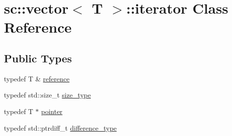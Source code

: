 \hypertarget{classsc_1_1vector_1_1iterator}{}\section{sc\+:\+:vector$<$ T $>$\+:\+:iterator Class Reference}
\label{classsc_1_1vector_1_1iterator}
\subsection*{Public Types}
\begin{DoxyCompactItemize}
\item 
typedef T \& \hyperlink{classsc_1_1vector_1_1iterator_a266d58fdf67f2129ef3dc99efd652e15}{reference}
\item 
typedef std\+::size\+\_\+t \hyperlink{classsc_1_1vector_1_1iterator_adbbf48cc59c1a22f89c9fa6a2eb0c765}{size\+\_\+type}
\item 
typedef T $\ast$ \hyperlink{classsc_1_1vector_1_1iterator_a518f02aadbb3fd937bdbda24120d2678}{pointer}
\item 
typedef std\+::ptrdiff\+\_\+t \hyperlink{classsc_1_1vector_1_1iterator_a7089358e9f654206713ecd3951ac3545}{difference\+\_\+type}
\end{DoxyCompactItemize}

